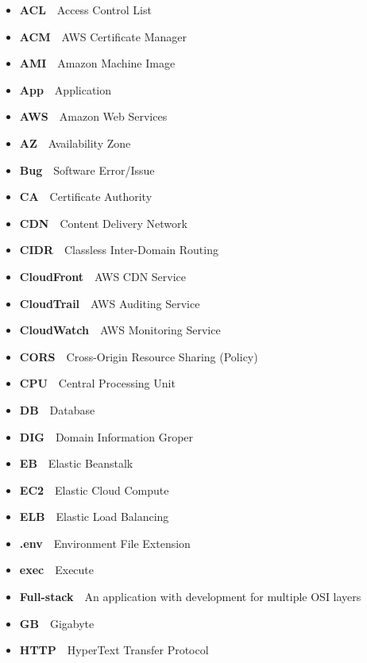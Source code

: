 
\begin{itemize}
    \item  \textbf{ACL}~\textemdash~Access Control List
    \item  \textbf{ACM}~\textemdash~AWS Certificate Manager
    \item  \textbf{AMI}~\textemdash~Amazon Machine Image
    \item  \textbf{App}~\textemdash~Application
    \item  \textbf{AWS}~\textemdash~Amazon Web Services
    \item  \textbf{AZ}~\textemdash~Availability Zone
    \item  \textbf{Bug}~\textemdash~Software Error/Issue
    \item  \textbf{CA}~\textemdash~Certificate Authority
    \item  \textbf{CDN}~\textemdash~Content Delivery Network
    \item  \textbf{CIDR}~\textemdash~Classless Inter-Domain Routing
    \item  \textbf{CloudFront}~\textemdash~AWS CDN Service
    \item  \textbf{CloudTrail}~\textemdash~AWS Auditing Service
    \item  \textbf{CloudWatch}~\textemdash~AWS Monitoring Service
    \item  \textbf{CORS}~\textemdash~Cross-Origin Resource Sharing (Policy)
    \item  \textbf{CPU}~\textemdash~Central Processing Unit
    \item  \textbf{DB}~\textemdash~Database
    \item  \textbf{DIG}~\textemdash~Domain Information Groper
    \item  \textbf{EB}~\textemdash~Elastic Beanstalk
    \item  \textbf{EC2}~\textemdash~Elastic Cloud Compute
    \item  \textbf{ELB}~\textemdash~Elastic Load Balancing
    \item  \textbf{.env}~\textemdash~Environment File Extension
    \item  \textbf{exec}~\textemdash~Execute
    \item  \textbf{Full-stack}~\textemdash~An application with development for multiple OSI layers
    \item  \textbf{GB}~\textemdash~Gigabyte
    \item  \textbf{HTTP}~\textemdash~HyperText Transfer Protocol

\end{itemize}
